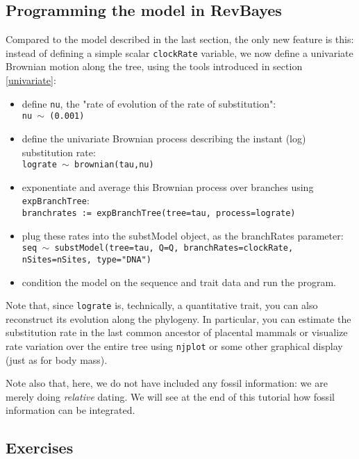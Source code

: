 \documentclass[usletter]{article}
\newcommand{\cmd}[1]{\texttt{#1}}
\begin{document}
\subsection*{Programming the model in RevBayes}

Compared to the model described in the last section, the only new feature is this: instead of defining a simple scalar \cmd{clockRate} variable, we now define a univariate Brownian motion along the tree, using the tools introduced in section \ref{univariate}:
\begin{itemize}
\item
define \cmd{nu}, the "rate of evolution of the rate of substitution":
\\
\cmd{nu $\sim$ (0.001)}
\item
define the univariate Brownian process describing the instant (log) substitution rate:
\\
\cmd{lograte $\sim$ brownian(tau,nu)}
\item
exponentiate and average this Brownian process over branches using \cmd{expBranchTree}:
\\
\cmd{branchrates := expBranchTree(tree=tau, process=lograte)}
\item
plug these rates into the substModel object, as the branchRates parameter:
\\
\cmd{seq $\sim$ substModel(tree=tau, Q=Q, branchRates=clockRate, nSites=nSites, type="DNA")}
\item
condition the model on the sequence and trait data and run the program.
\end{itemize}
Note that, since \cmd{lograte} is, technically, a quantitative trait, you can also reconstruct its evolution along the phylogeny. In particular, you can estimate the substitution rate in the last common ancestor of placental mammals or visualize rate variation over the entire tree using \cmd{njplot} or some other graphical display (just as for body mass).

Note also that, here, we do not have included any fossil information: we are merely doing \emph{relative} dating. We will see at the end of this tutorial how fossil information can be integrated.

\subsection*{Exercises}
\end{document}
